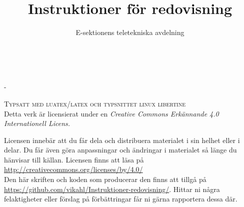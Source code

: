 \documentclass[%
	a4paper,
	twoside,
	titlepage,
	swedish,
	DIV=7,
	final,
	]{scrbook}
\title{Instruktioner för redovisning}
\author{E-sektionens teletekniska avdelning}
\newlength{\overhang}
\begin{document}
\frontmatter

\makeatletter
\begin{titlepage}
	\begin{flushright}
	\vspace*{0.45\textheight}
	{\Large \@title \\}
	{\scshape \@author}
	\end{flushright}


\end{titlepage}
\makeatother

\newpage
\begin{addmargin*}[0em]{-\overhang}
~\vfill
\thispagestyle{empty}

\textsc{Typsatt med luatex/latex och typsnittet linux libertine}\\[2\baselineskip]

Detta verk är licensierat under en \emph{Creative Commons Erkännande 4.0 Internationell Licens.}

Licensen innebär att du får dela och distribuera materialet i sin helhet eller i delar. Du får även göra anpassningar och ändringar i materialet så länge du hänvisar till källan. Licensen finns att läsa på \url{http://creativecommons.org/licenses/by/4.0/}\\[1.2\baselineskip]


Den här skriften och koden som producerar den finns att tillgå på \url{https://github.com/vikahl/Instruktioner-redovisning/}. Hittar ni några felaktigheter eller förslag på förbättringar får ni gärna rapportera dessa där.

\end{addmargin*}

% 
\end{document}
